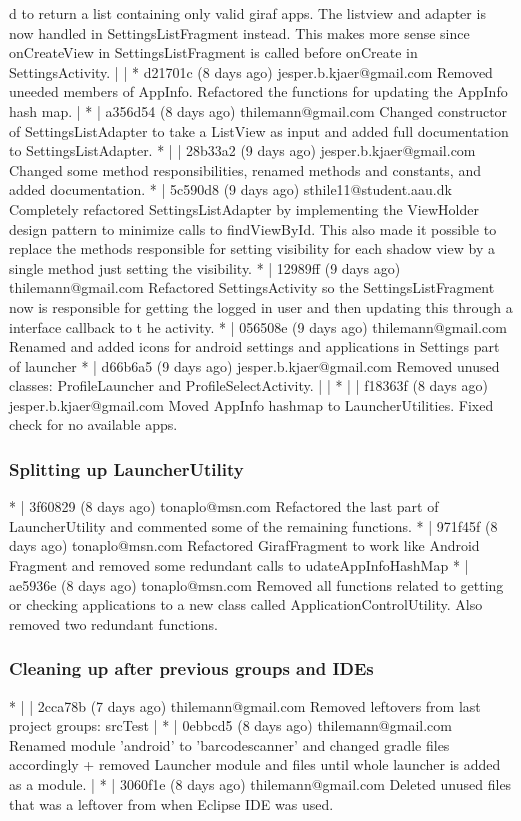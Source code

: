 d to return a list containing only valid giraf apps. The listview and adapter is now handled in SettingsListFragment instead. This makes more sense since onCreateView in SettingsListFragment is called before
 onCreate in SettingsActivity.
 | | * d21701c (8 days ago) jesper.b.kjaer@gmail.com Removed uneeded members of AppInfo. Refactored the functions for updating the AppInfo hash map.
 | * | a356d54 (8 days ago) thilemann@gmail.com Changed constructor of SettingsListAdapter to take a ListView as input and added full documentation to SettingsListAdapter.
 * | | 28b33a2 (9 days ago) jesper.b.kjaer@gmail.com Changed some method responsibilities, renamed methods and constants, and added documentation.
 * | 5c590d8 (9 days ago) sthile11@student.aau.dk Completely refactored SettingsListAdapter by implementing the ViewHolder design pattern to minimize calls to findViewById. This also made it possible to replace the methods responsible for setting visibility for each shadow view by a single method just setting the visibility.
 * | 12989ff (9 days ago) thilemann@gmail.com Refactored SettingsActivity so the SettingsListFragment now is responsible for getting the logged in user and then updating this through a interface callback to t
 he activity.
 * | 056508e (9 days ago) thilemann@gmail.com Renamed and added icons for android settings and applications in Settings part of launcher
 * | d66b6a5 (9 days ago) jesper.b.kjaer@gmail.com Removed unused classes: ProfileLauncher and ProfileSelectActivity.
 | | * | | f18363f (8 days ago) jesper.b.kjaer@gmail.com Moved AppInfo hashmap to LauncherUtilities. Fixed check for no available apps.
 
 \subsubsection{Splitting up LauncherUtility}
 * | 3f60829 (8 days ago) tonaplo@msn.com Refactored the last part of LauncherUtility and commented some of the remaining functions.
 * | 971f45f (8 days ago) tonaplo@msn.com Refactored GirafFragment to work like Android Fragment and removed some redundant calls to udateAppInfoHashMap
 * | ae5936e (8 days ago) tonaplo@msn.com Removed all functions related to getting or checking applications to a new class called ApplicationControlUtility. Also removed two redundant functions.

\subsubsection{Cleaning up after previous groups and IDEs}
* | | 2cca78b (7 days ago) thilemann@gmail.com Removed leftovers from last project groups: srcTest
| * | 0ebbcd5 (8 days ago) thilemann@gmail.com Renamed module 'android' to 'barcodescanner' and changed gradle files accordingly + removed Launcher module and files until whole launcher is added as a module.
| * | 3060f1e (8 days ago) thilemann@gmail.com Deleted unused files that was a leftover from when Eclipse IDE was used.

